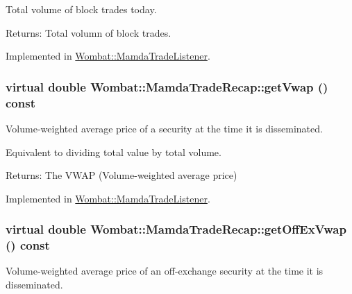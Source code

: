 Total volume of block trades today. 

\begin{Desc}
\item[Returns:]Total volumn of block trades. \end{Desc}


Implemented in \hyperlink{classWombat_1_1MamdaTradeListener_5d1de91179c83b06f897ee66c93174c1}{Wombat::Mamda\-Trade\-Listener}.\hypertarget{classWombat_1_1MamdaTradeRecap_b80bace23fde9c5712351bc6a9f2344b}{
\subsubsection[getVwap]{\setlength{\rightskip}{0pt plus 5cm}virtual double Wombat::Mamda\-Trade\-Recap::get\-Vwap () const}}
\label{classWombat_1_1MamdaTradeRecap_b80bace23fde9c5712351bc6a9f2344b}


Volume-weighted average price of a security at the time it is disseminated. 

Equivalent to dividing total value by total volume.

\begin{Desc}
\item[Returns:]The VWAP (Volume-weighted average price) \end{Desc}


Implemented in \hyperlink{classWombat_1_1MamdaTradeListener_3ca5f333c3c1962ad59dc7f87e6ea053}{Wombat::Mamda\-Trade\-Listener}.\hypertarget{classWombat_1_1MamdaTradeRecap_9c9488d1b62675928ec13e2f8d9fdd53}{
\subsubsection[getOffExVwap]{\setlength{\rightskip}{0pt plus 5cm}virtual double Wombat::Mamda\-Trade\-Recap::get\-Off\-Ex\-Vwap () const}}
\label{classWombat_1_1MamdaTradeRecap_9c9488d1b62675928ec13e2f8d9fdd53}


Volume-weighted average price of an off-exchange security at the time it is disseminated. 

